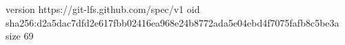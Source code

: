 version https://git-lfs.github.com/spec/v1
oid sha256:d2a5dac7dfd2e617fbb02416ea968e24b8772ada5e04ebd4f7075fafb8c5be3a
size 69
